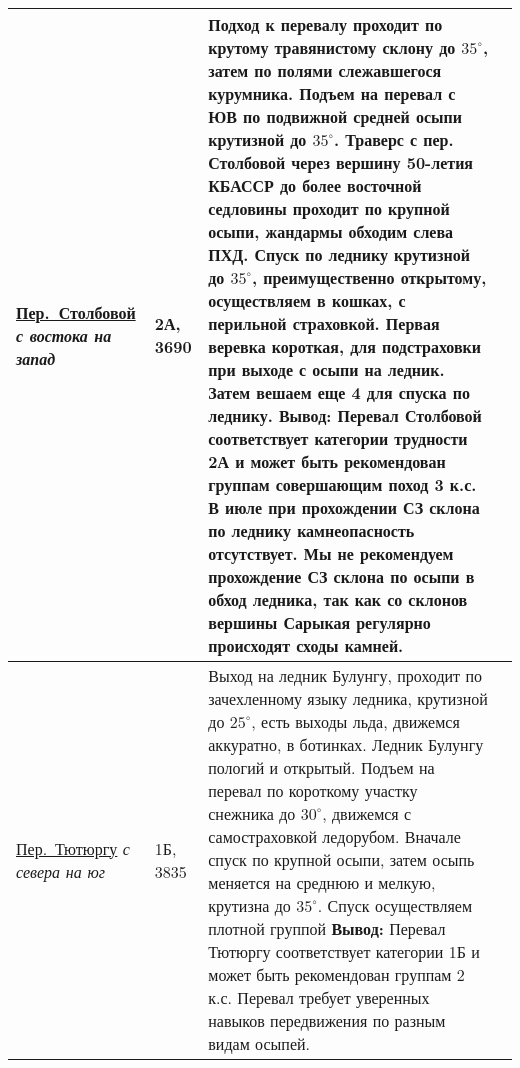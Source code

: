 {\begin{longtable}{|>{\centering\arraybackslash}m{3.8cm}|>{\centering\arraybackslash}m{1.3cm}|>{\raggedright\arraybackslash}m{11.5cm}|>{\centering\arraybackslash}m{1cm}|}
		 	\hyperref[subsec:Day11]{Пер.~Столбовой}																\newline\textit{с востока на запад}		&	2А, 3690					&	Подход к перевалу проходит по крутому травянистому склону  до $35^\circ$, затем по полями слежавшегося курумника. Подъем на перевал с ЮВ по подвижной средней осыпи крутизной до $35^\circ$. Траверс с пер. Столбовой через вершину 50-летия КБАССР до более восточной седловины проходит по крупной осыпи, жандармы обходим слева ПХД. Спуск по леднику крутизной до $35^\circ$, преимущественно открытому, осуществляем в кошках, с перильной страховкой. Первая веревка короткая, для подстраховки при выходе с осыпи на ледник. Затем вешаем еще 4 для спуска по леднику. \newline \textbf{Вывод:} Перевал Столбовой соответствует категории трудности 2А и может быть рекомендован группам совершающим поход 3 к.с. В июле при прохождении СЗ склона по леднику камнеопасность отсутствует. Мы не рекомендуем прохождение СЗ склона по осыпи в обход ледника, так как со склонов вершины Сарыкая регулярно происходят сходы камней.																																																																																																																																																																																																																																																																															&			\\ \hline
			\hyperref[subsec:Day12]{Пер.~Тютюргу}																\newline\textit{с севера на юг}			&	1Б, 3835					&	Выход на ледник Булунгу, проходит по зачехленному языку ледника, крутизной до $25^\circ$, есть выходы льда, движемся аккуратно, в ботинках. Ледник Булунгу пологий и открытый. Подъем на перевал по короткому участку снежника до $30^\circ$, движемся с самостраховкой ледорубом. Вначале спуск по крупной осыпи, затем осыпь меняется на среднюю и мелкую, крутизна до $35^\circ$. Спуск осуществляем плотной группой \newline \textbf{Вывод:} Перевал Тютюргу соответствует категории 1Б и может быть рекомендован группам 2 к.с. Перевал требует уверенных навыков передвижения по разным видам осыпей.																																																																																																																																																																																																																																																																																																																																																															&			\\ \hline

\end{longtable}}
